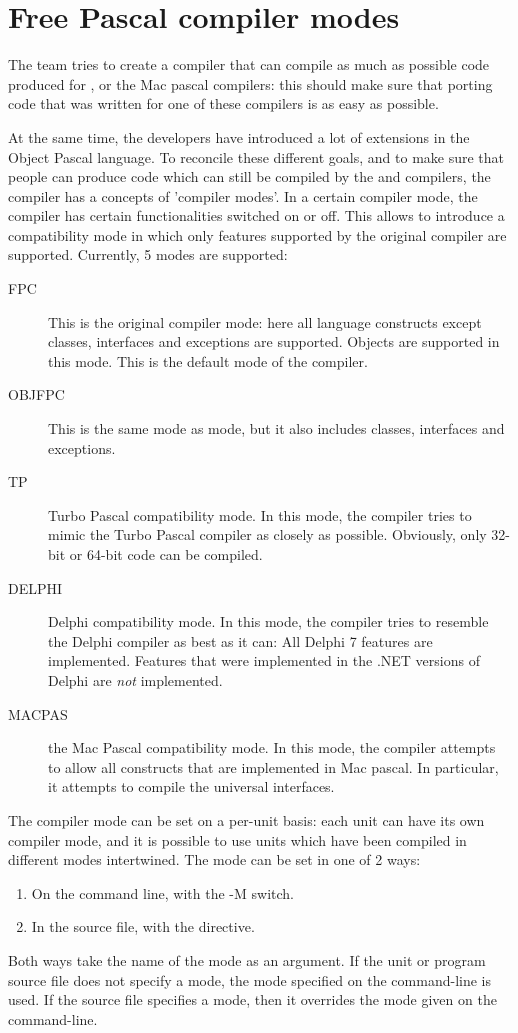 \section{Free Pascal compiler modes}
The \fpc team tries to create a compiler that can compile as much as
possible code produced for \tp, \delphi{} or the Mac pascal compilers: this
should make sure that porting code that was written for one of these
compilers is as easy as possible.

At the same time, the \fpc developers have introduced a lot of extensions
in the Object Pascal language. To reconcile these different goals, and to
make sure that people can produce code which can still be compiled by
the \tp and \delphi compilers, the compiler has a concepts of 'compiler
modes'. In a certain compiler mode, the compiler has certain functionalities
switched on or off. This allows to introduce a compatibility mode in which
only features supported by the original compiler are supported. Currently,
5 modes are supported:
\begin{description}
\item[FPC] This is the original \fpc compiler mode: here all language
constructs except classes, interfaces and exceptions are supported. 
Objects are supported in this mode. This is the default mode of the
compiler.
\item[OBJFPC] This is the same mode as  mode, but it also includes
classes, interfaces and exceptions.
\item[TP] Turbo Pascal compatibility mode. In this mode, the compiler tries
to mimic the Turbo Pascal compiler as closely as possible. Obviously, only
32-bit or 64-bit code can be compiled.
\item[DELPHI] Delphi compatibility mode. In this mode, the compiler tries
to resemble the Delphi compiler as best as it can: All Delphi 7 features are
implemented. Features that were implemented in the .NET versions of Delphi
are {\em not} implemented.
\item[MACPAS] the Mac Pascal compatibility mode. In this mode, the compiler
attempts to allow all constructs that are implemented in Mac pascal. In
particular, it attempts to compile the universal interfaces.
\end{description}

The compiler mode can be set on a per-unit basis: each unit can have its
own compiler mode, and it is possible to use units which have been compiled
in different modes intertwined. The mode can be set in one of 2 ways:
\begin{enumerate}
\item On the command line, with the -M switch. 
\item In the source file, with the  directive. 
\end{enumerate}
Both ways take the name of the mode as an argument. If the unit or program
source file does not specify a mode, the mode specified on the command-line
is used. If the source file specifies a mode, then it overrides the mode
given on the command-line. 

